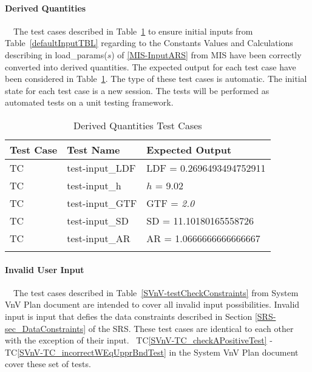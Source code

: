 \documentclass[12pt]{article}
\newcommand{\tcref}[1]{TC\ref{#1}}
\newcounter{utestnum} %
\begin{document}
\paragraph{Derived Quantities}

~\newline ~\newline \noindent The test cases described in
Table~\ref{DerivedValueTests} to ensure initial inputs from
Table~\ref{defaultInputTBL} regarding to the Constants Values and Calculations
describing in load\_params($s$) of \ref{MIS-InputARS} from MIS have been
correctly converted into derived quantities. The expected output for each test
case have been considered in Table~\ref{DerivedValueTests}. The type of these
test cases is automatic. The initial state for each test case is a new
session. The tests will be performed as automated tests on a unit testing
framework. 

\begin{longtable}{  l  p{4cm}  p{6cm}  }
	\hline
	\textbf{Test Case} & \textbf{Test Name} & \textbf{Expected Output} \\
	\hline
	TC{utestnum}\theutestnum  \label{TC_LDF} & 
	test-input\_LDF &  $\text{LDF}$ = 0.2696493494752911\\
	\hline 
	TC{utestnum}\theutestnum  \label{TC_h} & 
	test-input\_h &  $h$ = 9.02\\ 
	\hline
	TC{utestnum}\theutestnum  \label{TC_GTF} & 
	test-input\_GTF &   $\mbox{GTF}$ = \textit{2.0}\\ 
	\hline
	TC{utestnum}\theutestnum  \label{TC_SD} & 
	test-input\_SD &  $\mbox{SD}$ = 11.10180165558726\\ 
	\hline
	TC{utestnum}\theutestnum  \label{TC_AR} & 
	test-input\_AR &  $\mbox{AR}$ = 1.0666666666666667\\ 
	\hline
	\caption{Derived Quantities Test Cases}
	\label{DerivedValueTests}
\end{longtable}


\paragraph{Invalid User Input}


~\newline ~\newline \noindent The test cases described in
Table~\ref{SVnV-testCheckConstraints} from System VnV Plan document are intended
to cover all invalid input possibilities. Invalid input is input that defies the
data constraints described in Section \ref{SRS-sec_DataConstraints} of the
SRS. These test cases are identical to each other with the exception of their
input.  ~\newline \noindent \tcref{SVnV-TC_checkAPositiveTest} -
\tcref{SVnV-TC_incorrectWEqUpprBndTest} in the System VnV Plan document cover
these set of tests.
	
\end{document}
